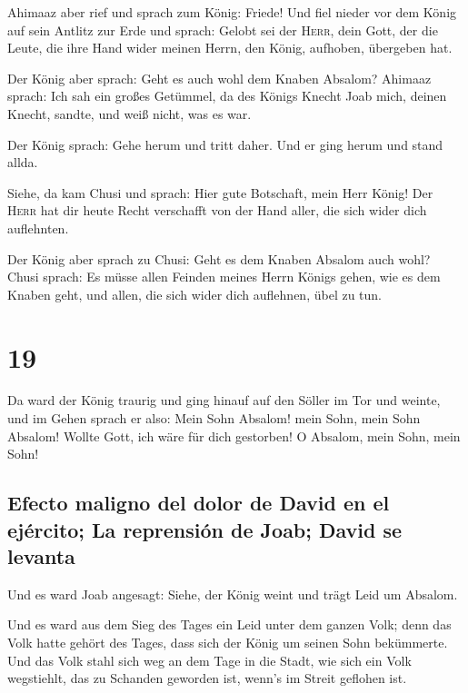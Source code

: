  Ahimaaz aber rief und sprach zum König: Friede! Und fiel
nieder vor dem König auf sein Antlitz zur Erde und sprach: Gelobt sei
der \textsc{Herr}, dein Gott, der die Leute, die ihre Hand wider meinen
Herrn, den König, aufhoben, übergeben hat.

 Der König aber sprach: Geht es auch wohl dem Knaben
Absalom? Ahimaaz sprach: Ich sah ein großes Getümmel, da des Königs
Knecht Joab mich, deinen Knecht, sandte, und weiß nicht, was es war.

 Der König sprach: Gehe herum und tritt daher. Und er
ging herum und stand allda.

 Siehe, da kam Chusi und sprach: Hier gute Botschaft,
mein Herr König! Der \textsc{Herr} hat dir heute Recht verschafft von
der Hand aller, die sich wider dich auflehnten.

 Der König aber sprach zu Chusi: Geht es dem Knaben
Absalom auch wohl? Chusi sprach: Es müsse allen Feinden meines Herrn
Königs gehen, wie es dem Knaben geht, und allen, die sich wider dich
auflehnen, übel zu tun.

\hypertarget{section-18}{%
\section{19}\label{section-18}}

 Da ward der König traurig und ging hinauf auf den Söller
im Tor und weinte, und im Gehen sprach er also: Mein Sohn Absalom! mein
Sohn, mein Sohn Absalom! Wollte Gott, ich wäre für dich gestorben! O
Absalom, mein Sohn, mein Sohn!

\hypertarget{efecto-maligno-del-dolor-de-david-en-el-ejuxe9rcito-la-reprensiuxf3n-de-joab-david-se-levanta}{%
\subsection{Efecto maligno del dolor de David en el ejército; La
reprensión de Joab; David se
levanta}\label{efecto-maligno-del-dolor-de-david-en-el-ejuxe9rcito-la-reprensiuxf3n-de-joab-david-se-levanta}}

 Und es ward Joab angesagt: Siehe, der König weint und
trägt Leid um Absalom.

 Und es ward aus dem Sieg des Tages ein Leid unter dem
ganzen Volk; denn das Volk hatte gehört des Tages, dass sich der König
um seinen Sohn bekümmerte.  Und das Volk stahl sich weg an
dem Tage in die Stadt, wie sich ein Volk wegstiehlt, das zu Schanden
geworden ist, wenn's im Streit geflohen ist.

